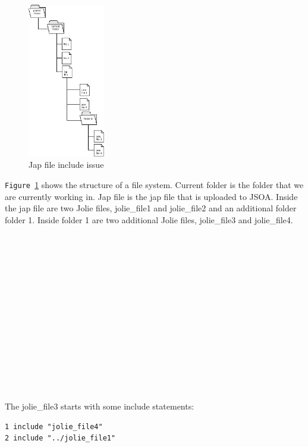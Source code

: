 \documentclass[12pt,a4paper]{article}
\begin{document}
\begin{figure}
  \begin{center}
    \includegraphics[width=0.3\textwidth]{../figures/jolie_jap_include_issue_graph.jpeg}
  \end{center}
  \caption{Jap file include issue}
  \label{fig:japIncludeIssue}
\end{figure}

\texttt{Figure \ref{fig:japIncludeIssue}} shows the structure of a file system. Current folder is the folder that we are currently working in. Jap file is the jap file that is uploaded to JSOA. Inside the jap file are two Jolie files, jolie\_file1 and jolie\_file2 and an additional folder folder 1. Inside folder 1 are two additional Jolie files, jolie\_file3 and jolie\_file4. \\
 ~\\ ~\\ ~\\ ~\\ ~\\ ~\\ ~\\ ~\\ ~\\ ~\\ ~\\ ~\\ ~\\ ~\\ ~\\
The jolie\_file3 starts with some include statements:
\begin{lstlisting}[caption={Include statements},label={lst:jolieTwoIncludeStatements}]
1 include "jolie_file4"
2 include "../jolie_file1"
\end{lstlisting}
\end{document}
